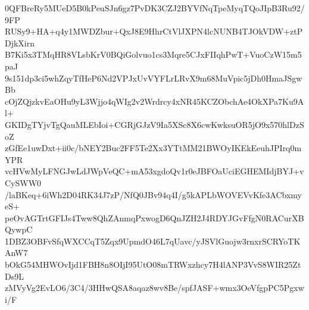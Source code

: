 0QFBreRy5MUeD5B0kPeuSJn6gz7PvDK3CZJ2BYVfNqTpeMyqTQoJIpB3Ru92/9FP
RUSy9+HA+q4y1MWDZbur+QxJ8E9HhrCtVlJXPN4lcNUNB4TJOkVDW+ztPDjkXirn
B7Ki5x3TMqHR8VLsbKrV0BQiGolvuo1cs3Mqre5CJxFIIqhPwT+VuoCzW15m5paJ
9s151dp3ci5whZqyTfHeP6Nd2VPJxUvVYFLrLRvX9m68MuVpic5jDh0HmaJSgwBb
cOjZQjzkvEaOHu9yL3Wjjo4qWIg2v2Wrdrcy4xNR45KCZObchAe4OkXPa7Ku9Al+
GKIDgTYjvTgQauMLEbIoi+CGRjGJzV9Ia5XSc8X6cwKwksuOR5jO9x570hlDzSoZ
zGfEe1uwDxt+ii0c/bNEY2Buc2FF5Te2Xx3YTtMM21BWOyIKEkEeuhJPIrq0mYPR
vcHVwMyLFNGJwLdJWpVeQC+mA53xgdoQv1r0eJBFOaUciEGHEMIdjBYJ+vCySWW0
/laBKeq+6iWh2D04RK34J7zP/NfQ0JBv94q4I/g5kAPLbWOVEVvKfe3ACbxmyeS+
peOvAGTrtGFIJs4Tww8QhZAnmqPxwogD6QnJZH2J4RDYJGvFfgN0RACurXBQywpC
1DBZ3OBFvSfqWXCCqT5Zqx9UpmdO46L7qUavc/yJSVlGuojw3rnxrSCRYoTKAnW7
bOkG54MHWOvIjd1FBH8n8OIjI95UtO08mTRWxzhcy7H4lANP3VvS8WIR25ZtDs9L
zMVyVg2EvLO6/3C4/3HHwQSA8aqaz8wv8Be/spfJASF+wmx3OeVfgpPC5Pgxwi/F
